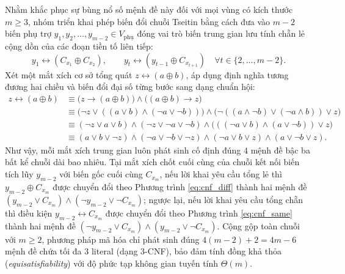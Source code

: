 Nhằm khắc phục sự bùng nổ số mệnh đề này đối với mọi vùng có kích thước $m \ge 3$,
nhóm triển khai phép biến đổi chuỗi Tseitin \cite{tseitin1983complexity} bằng
cách đưa vào $m - 2$ biến phụ trợ $y_1, y_2, \dots, y_{m-2} \in V_{\text{phụ}}$
đóng vai trò biến trung gian lưu tính chẵn lẻ cộng dồn của các đoạn tiền tố liên
tiếp:
\begin{equation}
    y_1 \leftrightarrow (C_{x_1} \oplus C_{x_2}), \qquad
    y_t \leftrightarrow (y_{t-1} \oplus C_{x_{t+1}}) \quad \forall t \in \{2, \dots, m - 2\}.
\end{equation}
Xét một mắt xích cơ sở tổng quát $z \leftrightarrow (a \oplus b)$, áp dụng định
nghĩa tương đương hai chiều và biến đổi đại số từng bước sang dạng chuẩn hội:
\begin{align}
    z \leftrightarrow (a \oplus b)
    &\equiv \big(z \to (a \oplus b)\big) \wedge \big((a \oplus b) \to z\big) \nonumber\\
    &\equiv \big(\neg z \vee ((a \vee b) \wedge (\neg a \vee \neg b))\big)
        \wedge \big(\neg((a \wedge \neg b) \vee (\neg a \wedge b)) \vee z\big) \nonumber\\
    &\equiv (\neg z \vee a \vee b) \wedge (\neg z \vee \neg a \vee \neg b)
        \wedge \big(((\neg a \vee b) \wedge (a \vee \neg b)) \vee z\big) \nonumber\\
    &\equiv (a \vee b \vee \neg z) \wedge (\neg a \vee \neg b \vee \neg z)
        \wedge (\neg a \vee b \vee z) \wedge (a \vee \neg b \vee z).
    \label{eq:xor_gate_cnf}
\end{align}
Như vậy, mỗi mắt xích trung gian luôn phát sinh cố định đúng $4$ mệnh đề bậc ba
bất kể chuỗi dài bao nhiêu. Tại mắt xích chốt cuối cùng của chuỗi kết nối biến
tích lũy $y_{m-2}$ với biến gốc cuối cùng $C_{x_m}$, nếu lời khai yêu cầu tổng lẻ
thì $y_{m-2} \oplus C_{x_m}$ được chuyển đổi theo Phương trình \eqref{eq:cnf_diff}
thành hai mệnh đề $(y_{m-2} \vee C_{x_m}) \wedge (\neg y_{m-2} \vee \neg
C_{x_m})$; ngược lại, nếu lời khai yêu cầu tổng chẵn thì điều kiện
$y_{m-2} \leftrightarrow C_{x_m}$ được chuyển đổi theo Phương trình
\eqref{eq:cnf_same} thành hai mệnh đề $(\neg y_{m-2} \vee C_{x_m}) \wedge (y_{m-2}
\vee \neg C_{x_m})$. Cộng gộp toàn chuỗi với $m \ge 2$, phương pháp mã hóa chỉ
phát sinh đúng $4(m - 2) + 2 = 4m - 6$ mệnh đề chứa tối đa $3$ literal (dạng
3-CNF), bảo đảm tính đồng khả thỏa (\textit{equisatisfiability}) với độ phức tạp
không gian tuyến tính $\Theta(m)$.

